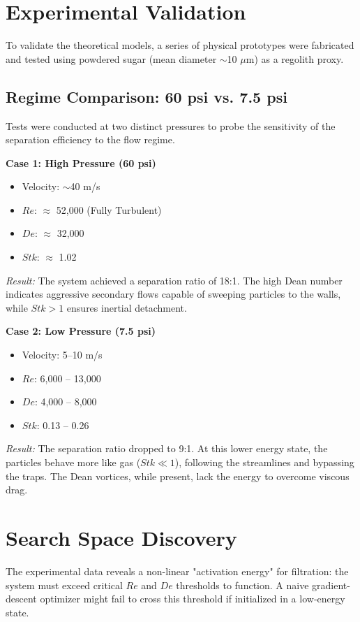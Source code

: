 \documentclass[twocolumn]{article}
\begin{document}
\section{Experimental Validation}

To validate the theoretical models, a series of physical prototypes were fabricated and tested using powdered sugar (mean diameter $\sim$10 $\mu$m) as a regolith proxy.

\subsection{Regime Comparison: 60 psi vs. 7.5 psi}
Tests were conducted at two distinct pressures to probe the sensitivity of the separation efficiency to the flow regime.

\textbf{Case 1: High Pressure (60 psi)}
\begin{itemize}
    \item Velocity: $\sim$40 m/s
    \item $Re$: $\approx$ 52,000 (Fully Turbulent)
    \item $De$: $\approx$ 32,000
    \item $Stk$: $\approx$ 1.02
\end{itemize}
\textit{Result:} The system achieved a separation ratio of 18:1. The high Dean number indicates aggressive secondary flows capable of sweeping particles to the walls, while $Stk > 1$ ensures inertial detachment.

\textbf{Case 2: Low Pressure (7.5 psi)}
\begin{itemize}
    \item Velocity: 5--10 m/s
    \item $Re$: 6,000 -- 13,000
    \item $De$: 4,000 -- 8,000
    \item $Stk$: 0.13 -- 0.26
\end{itemize}
\textit{Result:} The separation ratio dropped to 9:1. At this lower energy state, the particles behave more like gas ($Stk \ll 1$), following the streamlines and bypassing the traps. The Dean vortices, while present, lack the energy to overcome viscous drag.

\section{Search Space Discovery}

The experimental data reveals a non-linear "activation energy" for filtration: the system must exceed critical $Re$ and $De$ thresholds to function. A naive gradient-descent optimizer might fail to cross this threshold if initialized in a low-energy state.
\end{document}
